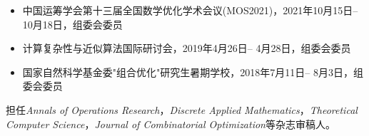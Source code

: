 %
%


{
\fontsize{9.65pt}{\baselineskip}\selectfont

\begin{itemize}[leftmargin=*]
	\item 中国运筹学会第十三届全国数学优化学术会议(MOS2021)，2021年10月15日-- 10月18日，组委会委员
	\item 计算复杂性与近似算法国际研讨会，2019年4月26日-- 4月28日，组委会委员
	\item 国家自然科学基金委"组合优化"研究生暑期学校，2018年7月11日-- 8月3日，组委会委员
\end{itemize}

担任\emph{Annals of Operations Research}，\emph{Discrete Applied Mathematics}，\emph{Theoretical Computer Science}，\emph{Journal of Combinatorial Optimization}等杂志审稿人。
}